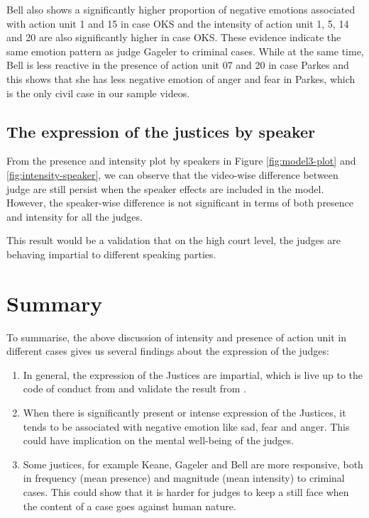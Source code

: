 \documentclass{monashthesis}
\begin{document}
Bell also shows a significantly higher proportion of negative emotions associated with action unit 1 and 15 in case OKS and the intensity of action unit 1, 5, 14 and 20 are also significantly higher in case OKS. These evidence indicate the same emotion pattern as judge Gageler to criminal cases. While at the same time, Bell is less reactive in the presence of action unit 07 and 20 in case Parkes and this shows that she has less negative emotion of anger and fear in Parkes, which is the only civil case in our sample videos.

\hypertarget{the-expression-of-the-justices-by-speaker}{%
\subsection{The expression of the justices by speaker}\label{the-expression-of-the-justices-by-speaker}}

From the presence and intensity plot by speakers in Figure \ref{fig:model3-plot} and \ref{fig:intensity-speaker}, we can observe that the video-wise difference between judge are still persist when the speaker effects are included in the model. However, the speaker-wise difference is not significant in terms of both presence and intensity for all the judges.

This result would be a validation that on the high court level, the judges are behaving impartial to different speaking parties.

\hypertarget{summary-1}{%
\section{Summary}\label{summary-1}}

To summarise, the above discussion of intensity and presence of action unit in different cases gives us several findings about the expression of the judges:

\begin{enumerate}
\def\labelenumi{\arabic{enumi})}
\item
  In general, the expression of the Justices are impartial, which is live up to the code of conduct from \textcite{judicalguid} and validate the result from \textcite{tutton2018judicial}.
\item
  When there is significantly present or intense expression of the Justices, it tends to be associated with negative emotion like sad, fear and anger. This could have implication on the mental well-being of the judges.
\item
  Some justices, for example Keane, Gageler and Bell are more responsive, both in frequency (mean presence) and magnitude (mean intensity) to criminal cases. This could show that it is harder for judges to keep a still face when the content of a case goes against human nature.
\end{enumerate}
\end{document}
